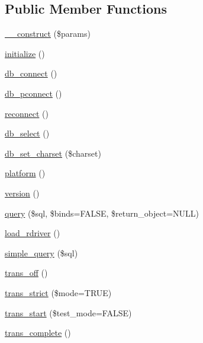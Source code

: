 \subsection*{Public Member Functions}
\begin{DoxyCompactItemize}
\item 
\hyperlink{class_c_i___d_b__driver_a9162320adff1a1a4afd7f2372f753a3e}{\+\_\+\+\_\+construct} (\$params)
\item 
\hyperlink{class_c_i___d_b__driver_a91098fa7d1917ce4833f284bbef12627}{initialize} ()
\item 
\hyperlink{class_c_i___d_b__driver_a6aa545dcb7768f0b62d37cdcf7f09adc}{db\+\_\+connect} ()
\item 
\hyperlink{class_c_i___d_b__driver_a0f69e662bd02de5bcf98647068e7c653}{db\+\_\+pconnect} ()
\item 
\hyperlink{class_c_i___d_b__driver_a57c19c642ab3023e28d10c50f86ff0a8}{reconnect} ()
\item 
\hyperlink{class_c_i___d_b__driver_af0c7f2602586ea2050b19fb36baefb24}{db\+\_\+select} ()
\item 
\hyperlink{class_c_i___d_b__driver_a66d47c23180629f6ccea934fd2ab6d0e}{db\+\_\+set\+\_\+charset} (\$charset)
\item 
\hyperlink{class_c_i___d_b__driver_ad69bddb2ba31b27415484b3da4213ba8}{platform} ()
\item 
\hyperlink{class_c_i___d_b__driver_a6080dae0886626b9a4cedb29240708b1}{version} ()
\item 
\hyperlink{class_c_i___d_b__driver_a4711d63638a755f763352472063f0bbf}{query} (\$sql, \$binds=F\+A\+L\+S\+E, \$return\+\_\+object=N\+U\+L\+L)
\item 
\hyperlink{class_c_i___d_b__driver_a0bd509a0088f09f4bbfbcbbe78bc3547}{load\+\_\+rdriver} ()
\item 
\hyperlink{class_c_i___d_b__driver_a6ac4d82d7ba4e8df07e1367229084c91}{simple\+\_\+query} (\$sql)
\item 
\hyperlink{class_c_i___d_b__driver_ae9080ca6b0a9a258f5e87750b266e337}{trans\+\_\+off} ()
\item 
\hyperlink{class_c_i___d_b__driver_a648f8e6b3d0c53ce2afd63cfcea1fe74}{trans\+\_\+strict} (\$mode=T\+R\+U\+E)
\item 
\hyperlink{class_c_i___d_b__driver_ab082d21c9a77398c6d6705d9e978fb20}{trans\+\_\+start} (\$test\+\_\+mode=F\+A\+L\+S\+E)
\item 
\hyperlink{class_c_i___d_b__driver_aa0edd209de428801ce5faa1fe740852e}{trans\+\_\+complete} ()
\item 

\end{DoxyCompactItemize}
